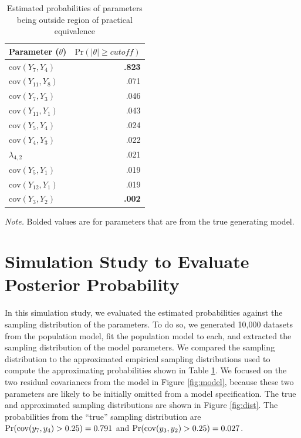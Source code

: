 \documentclass[noextraspace, floatsintext, 12pt]{apa7}
\begin{document}
\begin{table}[ht]
\centering
\begin{threeparttable}
\caption{Estimated probabilities of parameters being outside region of practical equivalence}
\label{tb:prob}
\begin{tabular}{lr}
  \toprule
Parameter ($\theta$) & $\mathrm{Pr}( \mid \theta \mid \geq cutoff)$\\ 
  \midrule
  	$\mathrm{cov}(Y_7, Y_4)$ & \textbf{.823}\\ 
	$\mathrm{cov}(Y_{11}, Y_8)$ &	.071\\
	$\mathrm{cov}(Y_7, Y_3)$ &	.046\\
	$\mathrm{cov}(Y_{11}, Y_1)$ &	.043\\
	$\mathrm{cov}(Y_5, Y_4)$ &	.024\\
	$\mathrm{cov}(Y_4, Y_3)$ &	.022\\
	$\lambda_{4,2}$ &	.021\\
	$\mathrm{cov}(Y_5, Y_1)$ &	.019\\
	$\mathrm{cov}(Y_{12}, Y_1)$ &	.019\\
	$\mathrm{cov}(Y_3, Y_2)$ &	\textbf{.002}\\   \bottomrule
\end{tabular}
\vspace*{1mm}
 	\begin{tablenotes}
    {\small
        \textit{Note.} Bolded values are for parameters that are from the true generating model.
    }
 	\end{tablenotes}
 \end{threeparttable}
\end{table}


\section{Simulation Study to Evaluate Posterior Probability}

In this simulation study, we evaluated the estimated probabilities against the sampling distribution of the parameters.
To do so, we generated 10,000 datasets from the population model, fit the population model to each, and extracted the sampling distribution of the model parameters.
We compared the sampling distribution to the approximated empirical sampling distributions used to compute the approximating probabilities shown in Table \ref{tb:prob}.
We focused on the two residual covariances from the model in Figure \ref{fig:model}, because these two parameters are likely to be initially omitted from a model specification.
The true and approximated sampling distributions are shown in Figure \ref{fig:dist}.
The probabilities from the ``true'' sampling distribution are ${\rm Pr}(\mathrm{cov}(y_7, y_4) > 0.25) = 0.791$ and ${\rm Pr}(\mathrm{cov}(y_3, y_2) > 0.25) = 0.027$.
\end{document}

